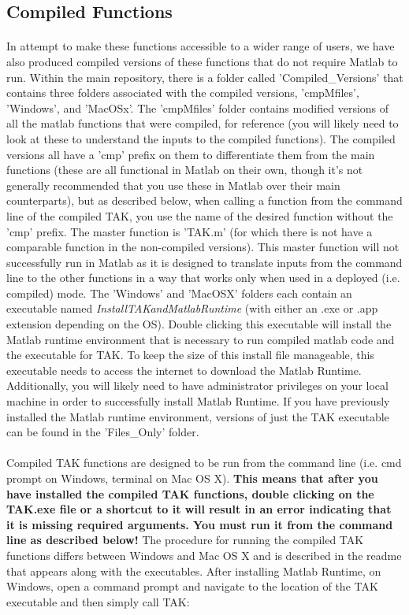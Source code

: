 \subsection{Compiled Functions} \label{sec:CmpFunc}
\paragraph{}In attempt to make these functions accessible to a wider range of users, we have also produced compiled versions of these functions that do not require Matlab to run. Within the main repository, there is a folder called 'Compiled\_Versions' that contains three folders associated with the compiled versions, 'cmpMfiles', 'Windows', and 'MacOSx'. The 'cmpMfiles' folder contains modified versions of all the matlab functions that were compiled, for reference (you will likely need to look at these to understand the inputs to the compiled functions). The compiled versions all have a 'cmp' prefix on them to differentiate them from the main functions (these are all functional in Matlab on their own, though it's not generally recommended that you use these in Matlab over their main counterparts), but as described below, when calling a function from the command line of the compiled TAK, you use the name of the desired function without the 'cmp' prefix. The master function is 'TAK.m' (for which there is not have a comparable function in the non-compiled versions). This master function will not successfully run in Matlab as it is designed to translate inputs from the command line to the other functions in a way that works only when used in a deployed (i.e. compiled) mode. The 'Windows' and 'MacOSX' folders each contain an executable named \textit{InstallTAKandMatlabRuntime} (with either an .exe or .app extension depending on the OS). Double clicking this executable will install the Matlab runtime environment that is necessary to run compiled matlab code and the executable for TAK. To keep the size of this install file manageable, this executable needs to access the internet to download the Matlab Runtime. Additionally, you will likely need to have administrator privileges on your local machine in order to successfully install Matlab Runtime. If you have previously installed the Matlab runtime environment, versions of just the TAK executable can be found in the 'Files\_Only' folder. 

\paragraph{}Compiled TAK functions are designed to be run from the command line (i.e. cmd prompt on Windows, terminal on Mac OS X). \textbf{This means that after you have installed the compiled TAK functions, double clicking on the TAK.exe file or a shortcut to it will result in an error indicating that it is missing required arguments. You must run it from the command line as described below!} The procedure for running the compiled TAK functions differs between Windows and Mac OS X and is described in the readme that appears along with the executables. After installing Matlab Runtime, on Windows, open a command prompt and navigate to the location of the TAK executable and then simply call TAK:

